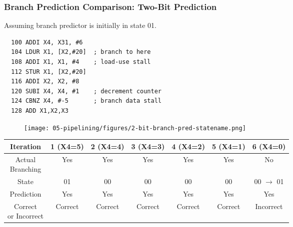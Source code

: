 \begin{frame}[fragile]\frametitle{Branch Prediction Comparison: Two-Bit Prediction}
Assuming branch predictor is initially in state 01.
\begin{multicols}{2}
{\tiny
\begin{verbatim}
  100 ADDI X4, X31, #6
  104 LDUR X1, [X2,#20]  ; branch to here
  108 ADDI X1, X1, #4    ; load-use stall
  112 STUR X1, [X2,#20]
  116 ADDI X2, X2, #8
  120 SUBI X4, X4, #1    ; decrement counter
  124 CBNZ X4, #-5       ; branch data stall
  128 ADD X1,X2,X3       
\end{verbatim}
}
\columnbreak
\begin{figure}[H]
\centering
	{\texttt{[image: 05-pipelining/figures/2-bit-branch-pred-statename.png]}}
\end{figure}    
\end{multicols}

{\footnotesize
\begin{center}
	\begin{tabular}{c|cccccc}
Iteration &  1 (X4=5) & 2 (X4=4) & 3 (X4=3) & 4 (X4=2) & 5 (X4=1) & 6 (X4=0) \\\hline
\makecell{Actual\\Branching} & Yes & Yes & Yes & Yes & Yes & No\\ \hline
State      & 01 & 00 & 00 & 00 & 00 & 00 {$\rightarrow$ 01}\\ \hline
Prediction & Yes & Yes & Yes & Yes & Yes & Yes \\ \hline
\makecell{Correct \\or Incorrect} & Correct & Correct & Correct & Correct & Correct & Incorrect \\ \hline
\end{tabular}
\end{center}
}
\end{frame}

